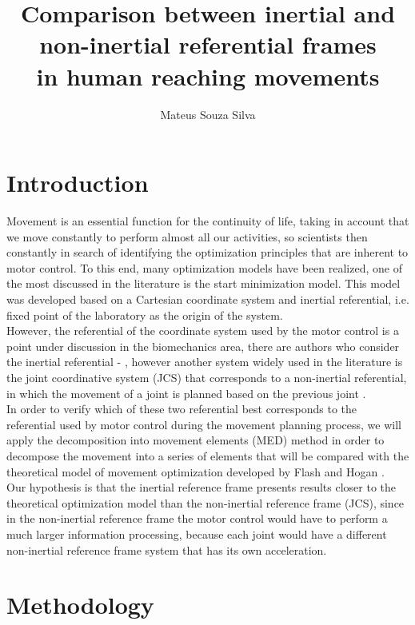 \documentclass{article}
\title{Comparison between inertial and non-inertial referential frames \\
in human reaching movements}
\author{Mateus Souza Silva}
\date{}
\begin{document}
\maketitle

\section{Introduction}


Movement is an essential function for the continuity of life, taking in account that we move constantly to perform almost all our activities, so scientists then constantly in search of identifying the optimization principles that are inherent to motor control. To this end, many optimization models have been realized, one of the most discussed in the literature is the \cite{hogan, hoff} start minimization model. This model was developed based on a Cartesian coordinate system and inertial referential, i.e. fixed point of the laboratory as the origin of the system.
\\

However, the referential of the coordinate system used by the motor control is a point under discussion in the biomechanics area, there are authors who consider the inertial referential - \cite{hogan, hoff, miranda, delemos}, however another system widely used in the literature is the joint coordinative system (JCS) that corresponds to a non-inertial referential, in which the movement of a joint is planned based on the previous joint \cite{jcs}.
\\

In order to verify which of these two referential best corresponds to the referential used by motor control during the movement planning process, we will apply the decomposition into movement elements (MED) method \cite{miranda} in order to decompose the movement into a series of elements that will be compared with the theoretical model of movement optimization developed by Flash and Hogan \cite{hogan}.
\\

Our hypothesis is that the inertial reference frame presents results closer to the theoretical optimization model than the non-inertial reference frame (JCS), since in the non-inertial reference frame the motor control would have to perform a much larger information processing, because each joint would have a different non-inertial reference frame system that has its own acceleration.
\\

\section{Methodology}
\end{document}

